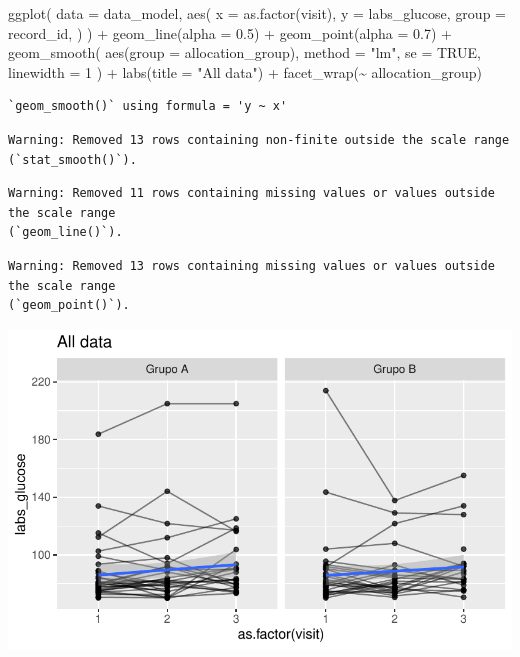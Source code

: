 \documentclass[
  letterpaper,
  DIV=11,
  numbers=noendperiod]{scrartcl}
\newenvironment{Shaded}{\begin{snugshade}}{\end{snugshade}}
\newcommand{\AttributeTok}[1]{\textcolor[rgb]{0.40,0.45,0.13}{#1}}
\newcommand{\ConstantTok}[1]{\textcolor[rgb]{0.56,0.35,0.01}{#1}}
\newcommand{\DecValTok}[1]{\textcolor[rgb]{0.68,0.00,0.00}{#1}}
\newcommand{\FloatTok}[1]{\textcolor[rgb]{0.68,0.00,0.00}{#1}}
\newcommand{\FunctionTok}[1]{\textcolor[rgb]{0.28,0.35,0.67}{#1}}
\newcommand{\NormalTok}[1]{\textcolor[rgb]{0.00,0.23,0.31}{#1}}
\newcommand{\SpecialCharTok}[1]{\textcolor[rgb]{0.37,0.37,0.37}{#1}}
\newcommand{\StringTok}[1]{\textcolor[rgb]{0.13,0.47,0.30}{#1}}
\begin{document}
\begin{Shaded}
\begin{Highlighting}[]
\FunctionTok{ggplot}\NormalTok{(}
    \AttributeTok{data =}\NormalTok{ data\_model, }
    \FunctionTok{aes}\NormalTok{(}
        \AttributeTok{x =} \FunctionTok{as.factor}\NormalTok{(visit),}
        \AttributeTok{y =}\NormalTok{ labs\_glucose,}
        \AttributeTok{group =}\NormalTok{ record\_id,}
\NormalTok{    )}
\NormalTok{) }\SpecialCharTok{+}
    \FunctionTok{geom\_line}\NormalTok{(}\AttributeTok{alpha =} \FloatTok{0.5}\NormalTok{) }\SpecialCharTok{+}
    \FunctionTok{geom\_point}\NormalTok{(}\AttributeTok{alpha =} \FloatTok{0.7}\NormalTok{) }\SpecialCharTok{+}
    \FunctionTok{geom\_smooth}\NormalTok{(}
        \FunctionTok{aes}\NormalTok{(}\AttributeTok{group =}\NormalTok{ allocation\_group),}
        \AttributeTok{method =} \StringTok{"lm"}\NormalTok{,}
        \AttributeTok{se =} \ConstantTok{TRUE}\NormalTok{,}
        \AttributeTok{linewidth =} \DecValTok{1}
\NormalTok{    ) }\SpecialCharTok{+}
    \FunctionTok{labs}\NormalTok{(}\AttributeTok{title =} \StringTok{"All data"}\NormalTok{) }\SpecialCharTok{+}
    \FunctionTok{facet\_wrap}\NormalTok{(}\SpecialCharTok{\textasciitilde{}}\NormalTok{ allocation\_group) }
\end{Highlighting}
\end{Shaded}

\begin{verbatim}
`geom_smooth()` using formula = 'y ~ x'
\end{verbatim}

\begin{verbatim}
Warning: Removed 13 rows containing non-finite outside the scale range
(`stat_smooth()`).
\end{verbatim}

\begin{verbatim}
Warning: Removed 11 rows containing missing values or values outside the scale range
(`geom_line()`).
\end{verbatim}

\begin{verbatim}
Warning: Removed 13 rows containing missing values or values outside the scale range
(`geom_point()`).
\end{verbatim}

\includegraphics{Outcomes_V1V2V3_files/figure-pdf/labs_glucose_6-1.pdf}
\end{document}
